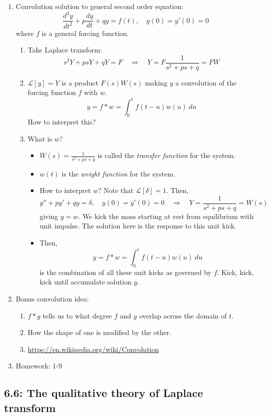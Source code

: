 \documentclass{article}
\begin{document}
\begin{enumerate}
\item Convolution solution to general second order equation:
\[
\frac{d^2 y}{dt^2} + p \frac{dy}{dt} + qy = f(t), \quad y(0)=y'(0)=0
\]
where $f$ is a general forcing function.
\begin{enumerate}
\item Take Laplace transform:
\[
s^2 Y + p s Y + q Y = F \quad \Rightarrow \quad Y = F \frac{1}{s^2+ps+q} = F W
\]
\item $\mathcal{L}[y]=Y$ is a product $F(s)W(s)$ making $y$ a convolution of the forcing function $f$ with $w$.
\[
y = f \ast w = \int_0^t f(t-u)w(u)~du
\]
How to interpret this?
\item What is $w$?
\begin{itemize}
\item $W(s) = \frac{1}{s^2+ps+q}$ is called the \emph{transfer function} for the system.
\item $w(t)$ is the \emph{weight function} for the system.
\item How to interpret $w$? Note that $\mathcal{L}[\delta]=1$. Then,
\[
y''+py'+qy = \delta, \quad y(0)=y'(0)=0 \quad \Rightarrow \quad Y = \frac{1}{s^2+ps+q}=W(s)
\]
giving $y=w$. We kick the mass starting at rest from equilibrium with unit impulse. The solution here is the response to this unit kick.
\item Then,
\[
y = f \ast w = \int_0^t f(t-u)w(u)~du
\]
is the combination of all these unit kicks as governed by $f$. Kick, kick, kick until accumulate solution $y$.
\end{itemize}
\end{enumerate}

\item Bonus convolution idea: 
\begin{enumerate}
\item $f \ast g$ tells us to what degree $f$ and $g$ overlap across the domain of $t$. 
\item How the shape of one is modified by the other.
\item \url{https://en.wikipedia.org/wiki/Convolution}
\end{enumerate}

\item Homework: 1-9

\end{enumerate}

\subsection{6.6: The qualitative theory of Laplace transform}
\end{document}
